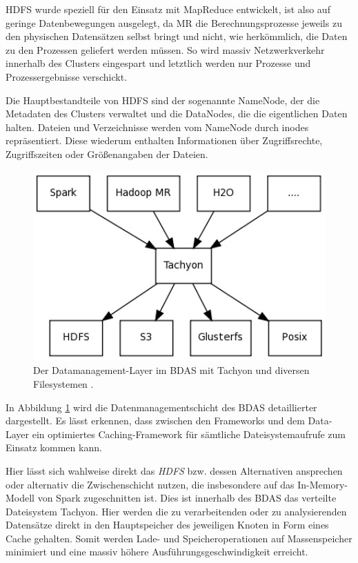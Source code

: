 HDFS wurde speziell für den Einsatz mit MapReduce entwickelt, ist also auf geringe Datenbewegungen ausgelegt, da MR die Berechnungsprozesse jeweils zu den physischen Datensätzen selbst bringt und nicht, wie herkömmlich, die Daten zu den Prozessen geliefert werden müssen. So wird massiv Netzwerkverkehr innerhalb des Clusters eingespart und letztlich werden nur Prozesse und Prozessergebnisse verschickt.  

Die Hauptbestandteile von HDFS sind der sogenannte NameNode, der die Metadaten des Clusters verwaltet und die DataNodes, die die eigentlichen Daten halten. Dateien und Verzeichnisse werden vom NameNode durch inodes repräsentiert. Diese wiederum enthalten Informationen über Zugriffsrechte, Zugriffszeiten oder Größenangaben der Dateien.



\begin{figure}[htb!] 
\centering
\includegraphics[width=1.0\textwidth]{bilder/2_3_stack.png}
\caption{Der Datamanagement-Layer im BDAS mit Tachyon und diversen Filesystemen \protect{}.}
\label{fig:datamgmtlayer}
\end{figure} 

 

In Abbildung \ref{fig:datamgmtlayer} wird die Datenmanagementschicht des BDAS detaillierter dargestellt. Es lässt erkennen, dass zwischen den Frameworks und dem Data-Layer ein optimiertes Caching-Framework für sämtliche Dateisystemaufrufe zum Einsatz kommen kann.  

Hier lässt sich wahlweise direkt das \textit{HDFS} bzw. dessen Alternativen ansprechen oder alternativ die Zwischenschicht nutzen, die insbesondere auf das In-Memory-Modell von Spark zugeschnitten ist. Dies ist innerhalb des BDAS das verteilte Dateisystem Tachyon. Hier werden die zu verarbeitenden oder zu analysierenden Datensätze direkt in den Hauptspeicher des jeweiligen Knoten in Form eines Cache gehalten. Somit werden Lade- und Speicheroperationen auf Massenspeicher minimiert und eine massiv höhere Ausführungsgeschwindigkeit erreicht.

